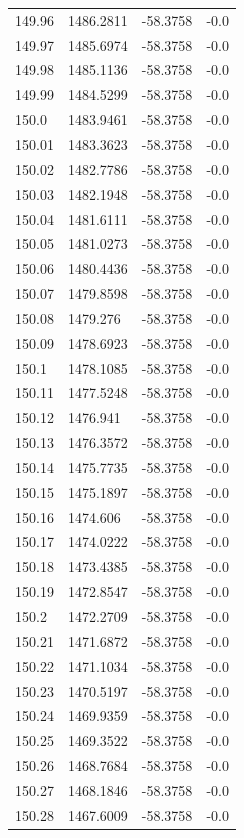 \begin{table}[H]
\begin{tabular}{llll}
149.96 & 1486.2811 & -58.3758 & -0.0 \\
149.97 & 1485.6974 & -58.3758 & -0.0 \\
149.98 & 1485.1136 & -58.3758 & -0.0 \\
149.99 & 1484.5299 & -58.3758 & -0.0 \\
150.0 & 1483.9461 & -58.3758 & -0.0 \\
150.01 & 1483.3623 & -58.3758 & -0.0 \\
150.02 & 1482.7786 & -58.3758 & -0.0 \\
150.03 & 1482.1948 & -58.3758 & -0.0 \\
150.04 & 1481.6111 & -58.3758 & -0.0 \\
150.05 & 1481.0273 & -58.3758 & -0.0 \\
150.06 & 1480.4436 & -58.3758 & -0.0 \\
150.07 & 1479.8598 & -58.3758 & -0.0 \\
150.08 & 1479.276 & -58.3758 & -0.0 \\
150.09 & 1478.6923 & -58.3758 & -0.0 \\
150.1 & 1478.1085 & -58.3758 & -0.0 \\
150.11 & 1477.5248 & -58.3758 & -0.0 \\
150.12 & 1476.941 & -58.3758 & -0.0 \\
150.13 & 1476.3572 & -58.3758 & -0.0 \\
150.14 & 1475.7735 & -58.3758 & -0.0 \\
150.15 & 1475.1897 & -58.3758 & -0.0 \\
150.16 & 1474.606 & -58.3758 & -0.0 \\
150.17 & 1474.0222 & -58.3758 & -0.0 \\
150.18 & 1473.4385 & -58.3758 & -0.0 \\
150.19 & 1472.8547 & -58.3758 & -0.0 \\
150.2 & 1472.2709 & -58.3758 & -0.0 \\
150.21 & 1471.6872 & -58.3758 & -0.0 \\
150.22 & 1471.1034 & -58.3758 & -0.0 \\
150.23 & 1470.5197 & -58.3758 & -0.0 \\
150.24 & 1469.9359 & -58.3758 & -0.0 \\
150.25 & 1469.3522 & -58.3758 & -0.0 \\
150.26 & 1468.7684 & -58.3758 & -0.0 \\
150.27 & 1468.1846 & -58.3758 & -0.0 \\
150.28 & 1467.6009 & -58.3758 & -0.0 \\

\end{tabular}
\end{table}
